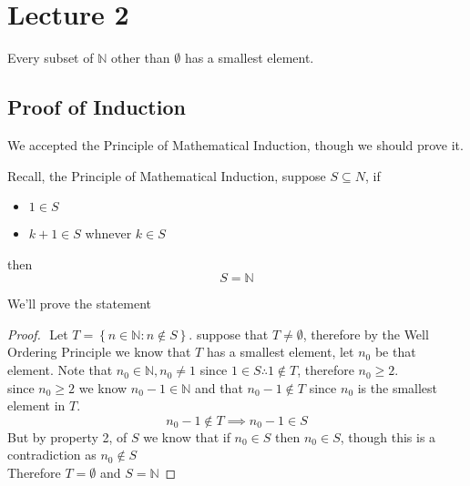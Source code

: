 \documentclass[11pt]{book}
\begin{document}


\chapter{Lecture 2}%
\label{chp:lecture_2}

\begin{defn}\label{defn:well_ordering_principle}
   Every subset of $\mathbb{N} $ other than $\emptyset $ has a smallest      element. 
\end{defn}

\section{Proof of Induction}%
\label{sec:proof_of_induction}

\begin{remark}
    We accepted the Principle of Mathematical Induction, though we should prove it.
\end{remark}

Recall, the Principle of Mathematical Induction, suppose $S \subseteq N$, if  
\begin{itemize}
    \item $1 \in S$ 
    \item $k + 1 \in S$ whnever $k\in S$ 
\end{itemize}
then 
\[
S= \mathbb{N} 
\]

We'll prove the statement
\begin{proof}
$ $\newline
    Let $T= \left\{ n\in \mathbb{N} : n \not\in S  \right\} $. suppose that $T\neq \emptyset $,  therefore by the Well Ordering Principle we know that $T$ has a smallest element, let $n_{0} $ be that element. Note that $n_{0} \in \mathbb{N}, n_{0} \neq 1 $ since $1\in S \therefore 1 \not\in T$, therefore $n_{0} \ge 2$.\\
    since $n_{0} \ge 2 $ we know $n_{0}  - 1 \in \mathbb{N} $ and that $n_{0}  - 1 \not\in T$ since $n_{0} $ is the smallest element in $T$. 
    \[
    n_{0}  - 1 \not\in T \implies n_{0}  - 1 \in S
    \]
    But by property 2, of $S$ we know that if $n_{0} \in S$ then $n_{0} \in S$,  though this is a contradiction as $n_{0} \not\in S$\\
    Therefore $T = \emptyset $ and $S = \mathbb{N} $ 
\end{proof}
\end{document}
